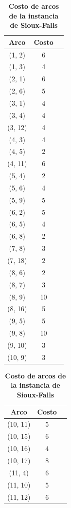 \documentclass{article}
\begin{document}
  \begin{table}[h!]
    \centering
    \caption*{{\bf Costo de arcos de la instancia de Sioux-Falls}}
    \begin{tabular}{ccc}
      \toprule
        Arco & Costo \\
      \midrule
        (1, 2) & 6 \\
        (1, 3) & 4 \\
        (2, 1) & 6 \\
        (2, 6) & 5 \\
        (3, 1) & 4 \\
        (3, 4) & 4 \\
        (3, 12) & 4 \\
        (4, 3) & 4 \\
        (4, 5) & 2 \\
        (4, 11) & 6 \\
        (5, 4) & 2 \\
        (5, 6) & 4 \\
        (5, 9) & 5 \\
        (6, 2) & 5 \\
        (6, 5) & 4 \\
        (6, 8) & 2 \\
        (7, 8) & 3 \\
        (7, 18) & 2 \\
        (8, 6) & 2 \\
        (8, 7) & 3 \\
        (8, 9) & 10 \\
        (8, 16) & 5 \\
        (9, 5) & 5 \\
        (9, 8) & 10 \\
        (9, 10) & 3 \\
        (10, 9) & 3 \\
      \bottomrule
    \end{tabular}
    \begin{tabular}{ccc}
      \toprule
        Arco & Costo \\
      \midrule
        (10, 11) & 5 \\
        (10, 15) & 6 \\
        (10, 16) & 4 \\
        (10, 17) & 8 \\
        (11, 4) & 6 \\
        (11, 10) & 5 \\
        (11, 12) & 6 \\

\end{tabular}
\end{table}
\end{document}
